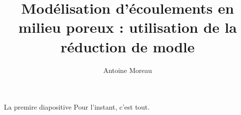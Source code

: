 \documentclass{beamer}
\title{Mod\'elisation d'\'ecoulements en milieu poreux : utilisation de la r\'eduction de mod\g{e}le}
\author{Antoine Moreau}
\begin{document}
\maketitle

\begin{frame}{La premire diapositive}
Pour l'instant, c'est tout.
\end{frame}
\end{document}
